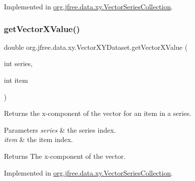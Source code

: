 Implemented in \mbox{\hyperlink{classorg_1_1jfree_1_1data_1_1xy_1_1_vector_series_collection_a6ab6bd07b9a775e401201ac380ee5750}{org.\+jfree.\+data.\+xy.\+Vector\+Series\+Collection}}.

\mbox{\label{interfaceorg_1_1jfree_1_1data_1_1xy_1_1_vector_x_y_dataset_a1126d5960a9f446d360f89715d93d209}} 
\subsubsection{\texorpdfstring{get\+Vector\+X\+Value()}{getVectorXValue()}}
{\footnotesize\ttfamily double org.\+jfree.\+data.\+xy.\+Vector\+X\+Y\+Dataset.\+get\+Vector\+X\+Value (\begin{DoxyParamCaption}\item[{int}]{series,  }\item[{int}]{item }\end{DoxyParamCaption})}

Returns the x-\/component of the vector for an item in a series.


\begin{DoxyParams}{Parameters}
{\em series} & the series index. \\
\hline
{\em item} & the item index.\\
\hline
\end{DoxyParams}
\begin{DoxyReturn}{Returns}
The x-\/component of the vector. 
\end{DoxyReturn}


Implemented in \mbox{\hyperlink{classorg_1_1jfree_1_1data_1_1xy_1_1_vector_series_collection_acb84437fda51302c4a5b8a300cd812fb}{org.\+jfree.\+data.\+xy.\+Vector\+Series\+Collection}}.

\mbox{\label{interfaceorg_1_1jfree_1_1data_1_1xy_1_1_vector_x_y_dataset_ac3a14bcfbf867f625abfe605a20d1d54}} 
